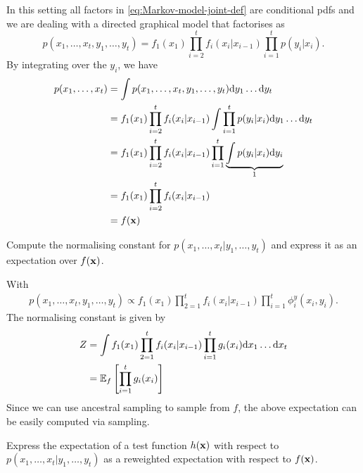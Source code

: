 \begin{exenumerate}
  \begin{solution}
    In this setting all factors in \eqref{eq:Markov-model-joint-def}
    are conditional pdfs and we are dealing with a directed graphical
    model that factorises as
    \begin{equation}
      p(x_1, \ldots, x_t, y_1, \ldots, y_t) = f_1(x_1) \prod_{i=2}^t f_i(x_i|x_{i-1}) \prod_{i=1}^t p(y_i|x_i).
    \end{equation}
    By integrating over the $y_i$, we have
    \begin{align}
      p(x_1, \ldots, x_t) &= \int p(x_1, \ldots, x_t, y_1, \ldots, y_t) \mathrm{d} y_1 \ldots \mathrm{d} y_t\\
      & = f_1(x_1) \prod_{i=2}^t f_i(x_i|x_{i-1}) \int \prod_{i=1}^t p(y_i|x_i) \mathrm{d} y_1 \ldots \mathrm{d} y_t\\
      & = f_1(x_1) \prod_{i=2}^t f_i(x_i|x_{i-1}) \prod_{i=1}^t \underbrace{\int  p(y_i|x_i) \mathrm{d} y_i}_{1}\\
      & = f_1(x_1) \prod_{i=2}^t f_i(x_i|x_{i-1})\\
      & = f(\mathbf{x})
    \end{align}
    
  \end{solution}
  
  
\item Compute the normalising constant for $p(x_1, \ldots, x_t | y_1, \ldots, y_t)$ and express it as an expectation over $f(\mathbf{x})$.
  \begin{solution}
    With
    \begin{align}
      p(x_1, \ldots, x_t, y_1, \ldots, y_t) \propto f_1(x_1) \prod_{2=1}^t f_i(x_i|x_{i-1}) \prod_{i=1}^t \phi_i^y(x_i, y_i).
    \end{align}
    The normalising constant is given by
    \begin{align}
      Z & = \int f_1(x_1) \prod_{2=1}^t f_i(x_i|x_{i-1})\prod_{i=1}^t g_i(x_i) \mathrm{d} x_1 \ldots \mathrm{d} x_t\\
      & = \mathbb{E}_f\left [\prod_{i=1}^t g_i(x_i) \right]
    \end{align}
    Since we can use ancestral sampling to sample from $f$, the
    above expectation can be easily computed via sampling.    
    
  \end{solution}

\item Express the expectation of a test function $h(\mathbf{x})$ with respect
  to $p(x_1, \ldots, x_t | y_1, \ldots, y_t)$ as a reweighted
  expectation with respect to $f(\mathbf{x})$.


\end{exenumerate}
